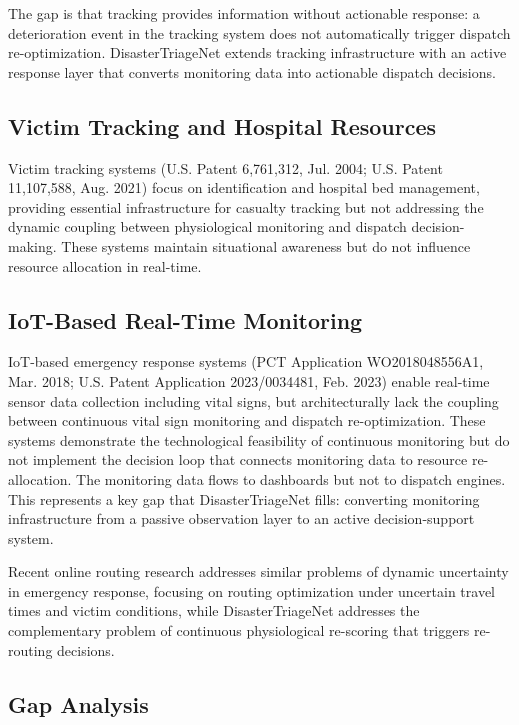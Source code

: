 \documentclass[conference]{IEEEtran}
\begin{document}
The gap is that tracking provides information without actionable response: a deterioration event in the tracking system does not automatically trigger dispatch re-optimization. DisasterTriageNet extends tracking infrastructure with an active response layer that converts monitoring data into actionable dispatch decisions.

\subsection{Victim Tracking and Hospital Resources}

Victim tracking systems (U.S. Patent 6,761,312, Jul. 2004; U.S. Patent 11,107,588, Aug. 2021) focus on identification and hospital bed management, providing essential infrastructure for casualty tracking but not addressing the dynamic coupling between physiological monitoring and dispatch decision-making. These systems maintain situational awareness but do not influence resource allocation in real-time.

\subsection{IoT-Based Real-Time Monitoring}

IoT-based emergency response systems (PCT Application WO2018048556A1, Mar. 2018; U.S. Patent Application 2023/0034481, Feb. 2023) enable real-time sensor data collection including vital signs, but architecturally lack the coupling between continuous vital sign monitoring and dispatch re-optimization. These systems demonstrate the technological feasibility of continuous monitoring but do not implement the decision loop that connects monitoring data to resource re-allocation. The monitoring data flows to dashboards but not to dispatch engines. This represents a key gap that DisasterTriageNet fills: converting monitoring infrastructure from a passive observation layer to an active decision-support system.

Recent online routing research \cite{shiri2024} addresses similar problems of dynamic uncertainty in emergency response, focusing on routing optimization under uncertain travel times and victim conditions, while DisasterTriageNet addresses the complementary problem of continuous physiological re-scoring that triggers re-routing decisions.

\subsection{Gap Analysis}
\end{document}
